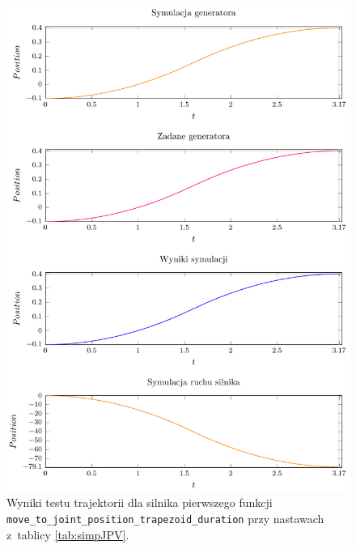 \documentclass[a4paper, 12pt]{article}
\begin{document}
	\begin{figure}[H]
		\centering
		\includegraphics[scale=1.05]{raport_graphs/simpJPD.pdf}
		\caption{Wyniki testu trajektorii dla silnika pierwszego funkcji \texttt{move\_to\_joint\_position\_trapezoid\_duration} przy nastawach z~tablicy \ref{tab:simpJPV}.}
		\label{fig:simpJPD}
	\end{figure}
	
\end{document}

